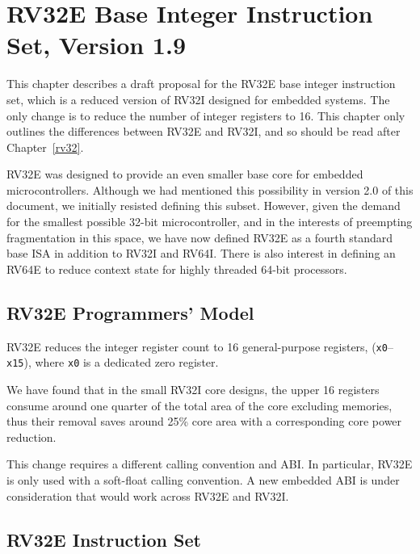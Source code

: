 \chapter{RV32E Base Integer Instruction Set, Version 1.9}
\label{rv32e}

This chapter describes a draft proposal for the RV32E base integer
instruction set, which is a reduced version of RV32I designed for
embedded systems.  The only change is to reduce the number of integer
registers to 16.  This chapter only outlines the differences between
RV32E and RV32I, and so should be read after Chapter~\ref{rv32}.

\begin{commentary}
RV32E was designed to provide an even smaller base core for embedded
microcontrollers.  Although we had mentioned this possibility in
version 2.0 of this document, we initially resisted defining this
subset. However, given the demand for the smallest possible 32-bit
microcontroller, and in the interests of preempting fragmentation in
this space, we have now defined RV32E as a fourth standard base ISA in
addition to RV32I and RV64I.  There is also interest in
defining an RV64E to reduce context state for highly threaded 64-bit
processors.
\end{commentary}

\section{RV32E Programmers' Model}

RV32E reduces the integer register count to 16 general-purpose
registers, ({\tt x0}--{\tt x15}), where {\tt x0} is a dedicated zero
register.

\begin{commentary}
We have found that in the small RV32I core designs, the upper 16
registers consume around one quarter of the total area of the core
excluding memories, thus their removal saves around 25\% core area
with a corresponding core power reduction.
\end{commentary}

\begin{commentary}
This change requires a different calling convention and ABI.  In
particular, RV32E is only used with a soft-float calling convention.
A new embedded ABI is under consideration that would work across RV32E
and RV32I.
\end{commentary}

\section{RV32E Instruction Set}

